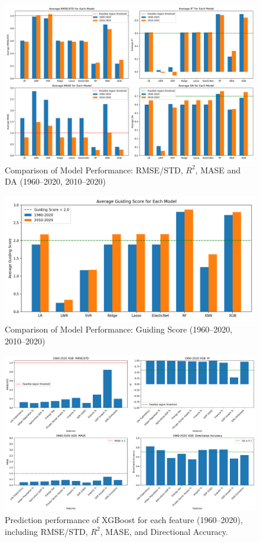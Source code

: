 \documentclass[12pt]{article}
\begin{document}
\begin{figure}[h]
    \centering
    \includegraphics[width = \linewidth]{Combined_Metrics_figure1.png}
    
    \caption{Comparison of Model Performance: RMSE/STD, $R^2$, MASE and DA (1960–2020, 2010–2020)}
    \label{fig:model_compare_1}
\end{figure}
\begin{figure}[H]
    \centering
    \includegraphics[width = \linewidth]{Average_GuidingScore_figure2.png}
    \caption{Comparison of Model Performance: Guiding Score (1960–2020, 2010–2020)}
    \label{fig:model_compare_2}
\end{figure}
\begin{figure}[H]
    \centering
    \includegraphics[width=\textwidth]{1960_2020_XGB_metrics_basic.png}
    \caption{Prediction performance of XGBoost for each feature (1960--2020), including RMSE/STD, $R^2$, MASE, and Directional Accuracy.}
    \label{fig:xgb_feature_summary}
\end{figure}
\end{document}

